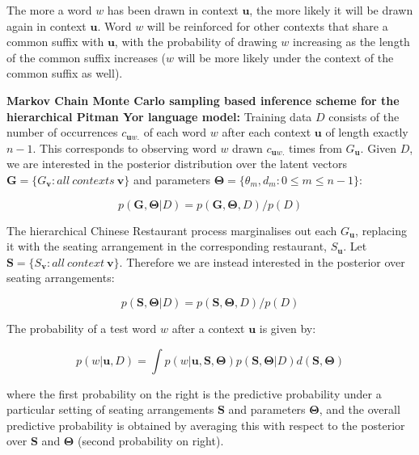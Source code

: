 The more a word $w$ has been drawn in context $\textbf{u}$, the more likely it will be drawn again in context $\textbf{u}$. Word $w$ will be reinforced for other contexts that share a common suffix with $\textbf{u}$, with the probability of drawing $w$ increasing as the length of the common suffix increases ($w$ will be more likely under the context of the common suffix as well).

\textbf{Markov Chain Monte Carlo sampling based inference scheme for the hierarchical Pitman Yor language model:} Training data $D$ consists of the number of occurrences $c_{\textbf{u}w.}$ of each word $w$ after each context $\textbf{u}$ of length exactly $n-1$. This corresponds to observing word $w$ drawn $c_{\textbf{u}w.}$ times from $G_{\textbf{u}}$. Given $D$, we are interested in the posterior distribution over the latent vectors $\textbf{G}=\{ G_{\textbf{v}}\colon all\ contexts\ \textbf{v} \} $ and parameters $\boldsymbol\Theta =\{ \theta_{m}, d_{m} \colon 0 \leq m \leq n-1 \}$:

\begin{equation}
p(\textbf{G}, \boldsymbol\Theta | D)=p(\textbf{G}, \boldsymbol\Theta, D)/p(D)
\label{eq:mcmcPosteriorG}
\end{equation}

The hierarchical Chinese Restaurant process marginalises out each $G_{\textbf{u}}$, replacing it with the seating arrangement in the corresponding restaurant, $S_{\textbf{u}}$. Let $\textbf{S}=\{S_{\textbf{v}}:all\ context\ \textbf{v}\}$. Therefore we are instead interested in the posterior over seating arrangements:

\begin{equation}
p(\textbf{S}, \boldsymbol\Theta |D)=p(\textbf{S}, \boldsymbol\Theta, D)/p(D)
\label{eq:mcmcPosteriorS}
\end{equation}

The probability of a test word $w$ after a context $\textbf{u}$ is given by:

\begin{equation}
p(w | \textbf{u}, D)=\int p(w | \textbf{u}, \textbf{S}, \boldsymbol\Theta)p(\textbf{S}, \boldsymbol\Theta | D)d(\textbf{S}, \boldsymbol\Theta)
\label{eq:mcmcWordProb}
\end{equation}

\noindent where the first probability on the right is the predictive probability under a particular setting of seating arrangements $\textbf{S}$ and parameters $\boldsymbol\Theta$, and the overall predictive probability is obtained by averaging this with respect to the posterior over $\textbf{S}$ and $\boldsymbol\Theta$ (second probability on right).

